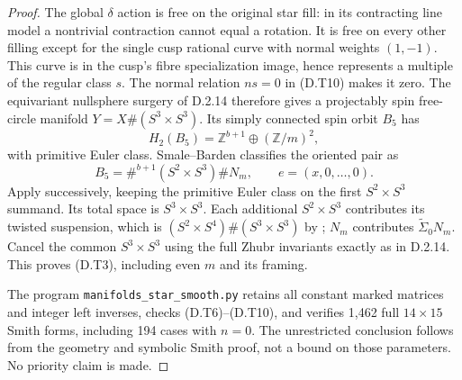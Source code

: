 \begin{proof}
The global $\delta$ action is free on the original star
fill: in its contracting line model a nontrivial contraction
cannot equal a rotation. It is free on every other filling
except for the single cusp rational curve with normal
weights $(1,-1)$. This curve is in the cusp's fibre
specialization image, hence represents a multiple of the
regular class $s$. The normal relation $ns=0$ in (D.T10)
makes it zero. The equivariant nullsphere surgery of D.2.14
therefore gives a projectably spin free-circle manifold
$Y=X\#(S^3\times S^3)$.
Its simply connected spin orbit $B_5$ has
\[
 H_2(B_5)=\mathbb Z^{b+1}\oplus(\mathbb Z/m)^2,
\]
with primitive Euler class. Smale--Barden classifies the
oriented pair as
\[
 B_5=\#^{b+1}(S^2\times S^3)\#N_m,
 \qquad e=(x,0,\ldots,0).
\]
Apply \cite[Theorem A]{manGR25} successively, keeping the
primitive Euler class on the first $S^2\times S^3$ summand.
Its total space is $S^3\times S^3$. Each additional
$S^2\times S^3$ contributes its twisted suspension, which
is $(S^2\times S^4)\#(S^3\times S^3)$ by
\cite[Theorem B(2)]{manGR25}; $N_m$ contributes
$\widetilde\Sigma_0N_m$. Cancel the common $S^3\times S^3$
using the full Zhubr invariants exactly as in D.2.14.
This proves (D.T3), including even $m$ and its framing.

The program \texttt{manifolds\_star\_smooth.py} retains all
constant marked matrices and integer left inverses,
checks (D.T6)--(D.T10), and verifies 1,462 full $14\times15$
Smith forms, including 194 cases with $n=0$. The unrestricted
conclusion follows from the geometry and symbolic Smith
proof, not a bound on those parameters. No priority claim
is made.
\end{proof}

